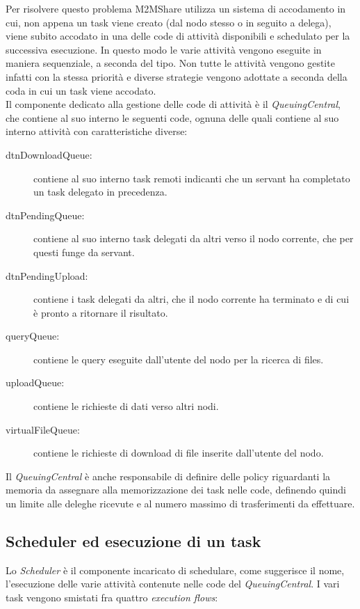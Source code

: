 Per risolvere questo problema M2MShare utilizza un sistema di accodamento in cui, non appena un task viene creato (dal nodo stesso o in seguito a delega), viene subito accodato in una delle code di attività disponibili e schedulato per la successiva esecuzione. In questo modo le varie attività vengono eseguite in maniera sequenziale, a seconda del tipo. Non tutte le attività vengono gestite infatti con la stessa priorità e diverse strategie vengono adottate a seconda della coda in cui un task viene accodato.
\\

Il componente dedicato alla gestione delle code di attività è il \textit{QueuingCentral}, che contiene al suo interno le seguenti code, ognuna delle quali contiene al suo interno attività con caratteristiche diverse:

\begin{description}
\item[dtnDownloadQueue:] contiene al suo interno task remoti indicanti che un servant ha completato un task delegato in precedenza.
\item[dtnPendingQueue:] contiene al suo interno task delegati da altri verso il nodo corrente, che per questi funge da servant.
\item[dtnPendingUpload:] contiene i task delegati da altri, che il nodo corrente ha terminato e di cui è pronto a ritornare il risultato.
\item[queryQueue:] contiene le query eseguite dall'utente del nodo per la ricerca di files.
\item[uploadQueue:] contiene le richieste di dati verso altri nodi.
\item[virtualFileQueue:] contiene le richieste di download di file inserite dall'utente del nodo.
\end{description}

Il \textit{QueuingCentral} è anche responsabile di definire delle policy riguardanti la memoria da assegnare alla memorizzazione dei task nelle code, definendo quindi un limite alle deleghe ricevute e al numero massimo di trasferimenti da effettuare.

\subsection{Scheduler ed esecuzione di un task}
Lo \textit{Scheduler} è il componente incaricato di schedulare, come suggerisce il nome, l'esecuzione delle varie attività contenute nelle code del \textit{QueuingCentral}. I vari task vengono smistati fra quattro \textit{execution flows}:

